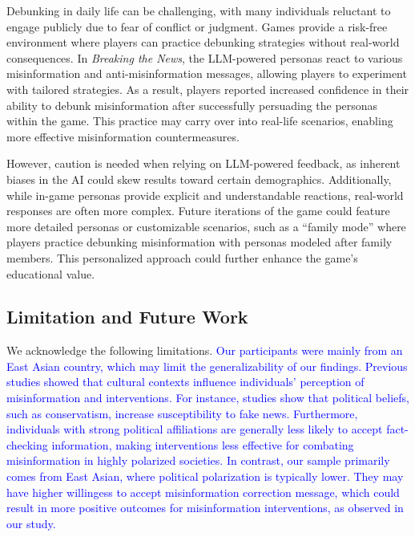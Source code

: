 Debunking in daily life can be challenging, with many individuals reluctant to engage publicly due to fear of conflict or judgment\cite{tang2024knows}. Games provide a risk-free environment where players can practice debunking strategies without real-world consequences. In \textit{Breaking the News}, the LLM-powered personas react to various misinformation and anti-misinformation messages, allowing players to experiment with tailored strategies. As a result, players reported increased confidence in their ability to debunk misinformation after successfully persuading the personas within the game. This practice may carry over into real-life scenarios, enabling more effective misinformation countermeasures.

However, caution is needed when relying on LLM-powered feedback, as inherent biases in the AI could skew results toward certain demographics\cite{xie2024can}. Additionally, while in-game personas provide explicit and understandable reactions, real-world responses are often more complex. Future iterations of the game could feature more detailed personas or customizable scenarios, such as a “family mode” where players practice debunking misinformation with personas modeled after family members. This personalized approach could further enhance the game’s educational value.


\subsection{Limitation and Future Work}
We acknowledge the following limitations. \textcolor{blue}{Our participants were mainly from an East Asian country, which may limit the generalizability of our findings. Previous studies showed that cultural contexts influence individuals’ perception of misinformation and interventions\cite{noman2024designing}. For instance, studies show that political beliefs, such as conservatism, increase susceptibility to fake news\cite{gupta2023fake,uscinski2020people}. Furthermore, individuals with strong political affiliations are generally less likely to accept fact-checking information\cite{jarman2016influence,walter2020fact}, making interventions less effective for combating misinformation in highly polarized societies. In contrast, our sample primarily comes from East Asian, where political polarization is typically lower. They may have higher willingess to accept misinformation correction message, which could result in more positive outcomes for misinformation interventions, as observed in our study.} 

